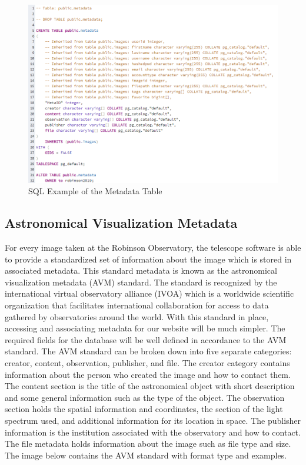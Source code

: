 \documentclass[12pt]{article}
\begin{document}
\begin{figure}[h]
	\centering
	\includegraphics[width=\linewidth]{database_metadata_table}
	\caption{SQL Example of the Metadata Table}
	\label{fig:SQL Metadata Table}
\end{figure}

\subsection{Astronomical Visualization Metadata}

For every image taken at the Robinson Observatory, the telescope software is able to provide a standardized set of information about the image which is stored in associated metadata.  This standard metadata is known as the astronomical visualization metadata (AVM) standard.  The standard is recognized by the international virtual observatory alliance (IVOA) which is a worldwide scientific organization that facilitates international collaboration for access to data gathered by observatories around the world.\cite{avmstandard}  With this standard in place, accessing and associating metadata for our website will be much simpler.  The required fields for the database will be well defined in accordance to the AVM standard.
The AVM standard can be broken down into five separate categories: creator, content, observation, publisher, and file.  The creator category contains information about the person who created the image and how to contact them.  The content section is the title of the astronomical object with short description and some general information such as the type of the object.  The observation section holds the spatial information and coordinates, the section of the light spectrum used, and additional information for its location in space.  The publisher information is the institution associated with the observatory and how to contact.  The file metadata holds information about the image such as file type and size.
The image below contains the AVM standard with format type and examples.
\end{document}

